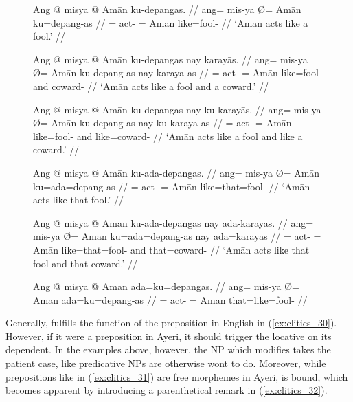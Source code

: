 \begin{figure}
\pex\label{ex:clitics_30}
\a\label{ex:clitics_30a}\begingl
	\gla Ang @ misya {} @ Amān ku-depangas. //
	\glb ang= mis-ya Ø= Amān ku=depang-as //
	\glc \AgtT{}= act-\TsgM{} \Top{}= Amān like=fool-\Parg{} //
	\glft `Amān acts like a fool.' //
\endgl

\a\label{ex:clitics_30b}\begingl
	\gla Ang @ misya {} @ Amān ku-depangas nay karayās. //
	\glb ang= mis-ya Ø= Amān ku-depang-as nay karaya-as //
	\glc \AgtT{}= act-\TsgM{} \Top{}= Amān like=fool-\Parg{} and 
		coward-\Parg{} //
	\glft `Amān acts like a fool and a coward.' //
\endgl

\a\label{ex:clitics_30c}\begingl
	\gla Ang @ misya {} @ Amān ku-depangas nay ku-karayās. //
	\glb ang= mis-ya Ø= Amān ku-depang-as nay ku-karaya-as //
	\glc \AgtT{}= act-\TsgM{} \Top{}= Amān like=fool-\Parg{} and 
		like=coward-\Parg{}	//
	\glft `Amān acts like a fool and like a coward.' //
\endgl

\a\label{ex:clitics_30d}\begingl
	\gla Ang @ misya {} @ Amān ku-ada-depangas. //
	\glb ang= mis-ya Ø= Amān ku=ada=depang-as //
	\glc \AgtT{}= act-\TsgM{} \Top{}= Amān like=that=fool-\Parg{} //
	\glft `Amān acts like that fool.' //
\endgl

\a\label{ex:clitics_30e}\begingl
	\gla Ang @ misya {} @ Amān ku-ada-depangas nay ada-karayās. //
	\glb ang= mis-ya Ø= Amān ku=ada=depang-as nay ada=karayās //
	\glc \AgtT{}= act-\TsgM{} \Top{}= Amān like=that=fool-\Parg{} and 
		that=coward-\Parg{} //
	\glft `Amān acts like that fool and that coward.' //
\endgl

\a\label{ex:clitics_30f}\ljudge{*}\begingl
	\gla Ang @ misya {} @ Amān ada=ku=depangas. //
	\glb ang= mis-ya Ø= Amān ada=ku=depang-as //
	\glc \AgtT{}= act-\TsgM{} \Top{}= Amān that=like=fool-\Parg{} //
\endgl
\xe
\end{figure}

Generally,  fulfills the function of the preposition 
in English in (\ref{ex:clitics_30}). However, if it were a preposition in
Ayeri, it should trigger the locative on its dependent. In the examples above,
however, the NP which  modifies takes the patient case, like
predicative NPs are otherwise wont to do. Moreover, while prepositions like
 in (\ref{ex:clitics_31}) are free morphemes in Ayeri,
 is bound, which becomes apparent by introducing a parenthetical
remark in (\ref{ex:clitics_32}).

